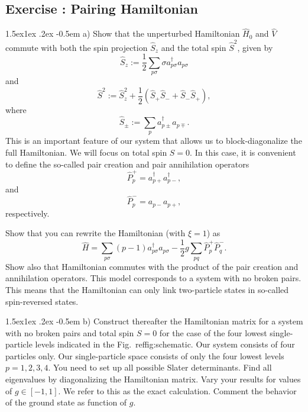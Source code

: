 \documentclass[%
twoside,                 %
final,                   %
10pt]{article}
\makeatletter
\newenvironment{doconceexercise}{}{}
\newcounter{doconceexercisecounter}
\newcommand\subex{\@startsection{paragraph}{4}{\z@}%
                  {1.5ex\@plus1ex \@minus.2ex}%
                  {-0.5em}%
                  {\normalfont\normalsize\bfseries}}
\makeatother
\begin{document}
\begin{doconceexercise}

\subsection*{Exercise \thedoconceexercisecounter: Pairing Hamiltonian}



\subex{a)}
Show that the unperturbed Hamiltonian $\hat{H}_0$ and $\hat{V}$
  commute with both the spin projection $\hat{S}_z$ and the total spin
  $\hat{S}^2$, given by
\[
  \hat{S}_z := \frac{1}{2}\sum_{p\sigma} \sigma
  a^{\dagger}_{p\sigma}a_{p\sigma}
\]
and
\[
  \hat{S}^2 := \hat{S}_z^2 + \frac{1}{2}(\hat{S}_+\hat{S}_- +
  \hat{S}_-\hat{S}_+),
\]
where
\[
  \hat{S}_\pm := \sum_{p} a^{\dagger}_{p\pm} a_{p\mp}.
\]
This is an important feature of our system that allows us to
block-diagonalize the full Hamiltonian. We will focus on total spin
$S=0$.  In this case, it is convenient to define the so-called pair
creation and pair annihilation operators
\[
\hat{P}^{+}_p = a^{\dagger}_{p+}a^{\dagger}_{p-},
\]
and
\[
\hat{P}^{-}_p = a_{p-}a_{p+},
\] 
respectively.

Show that you can rewrite the Hamiltonian (with $\xi=1$) as
\[
\hat{H}=\sum_{p\sigma}(p-1)a_{p\sigma}^{\dagger}a_{p\sigma}
-\frac{1}{2}g\sum_{pq}\hat{P}^{+}_p\hat{P}^{-}_q.
\]
Show also that Hamiltonian commutes with the product of the pair
creation and annihilation operators.  This model corresponds to a
system with no broken pairs. This means that the Hamiltonian can only
link two-particle states in so-called spin-reversed states.


\subex{b)}
Construct thereafter the Hamiltonian matrix for a system with no
  broken pairs and total spin $S=0$ for the case of the four lowest
  single-particle levels indicated in the
  Fig.~ref{fig:schematic}. Our system consists of four particles
  only.  Our single-particle space consists of only the four lowest
  levels $p=1,2,3,4$.  You need to set up all possible Slater
  determinants.  Find all eigenvalues by diagonalizing the Hamiltonian
  matrix.  Vary your results for values of $g\in [-1,1]$.  We refer to
  this as the exact calculation. Comment the behavior of the ground
  state as function of $g$.



\end{doconceexercise}
\end{document}
